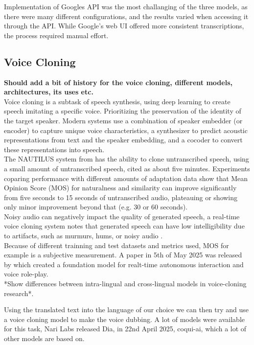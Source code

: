 \documentclass[12pt]{article}
\begin{document}
Implementation of Googles API was the most challanging of the three models, as there were many different configurations, and the results varied when accessing it through the API. While Google's web UI offered more consistent transcriptions, the process required manual effort. 

\subsection{Voice Cloning}
\textbf{Should add a bit of history for the voice cloning, different models, architectures, its uses etc.}\\Voice cloning is a subtask of speech synthesis, using deep learning to create speech imitating a specific voice. Prioritizing the preservation of the identity of the target speaker. Modern systems use a combination of speaker embedder (or encoder) to capture unique voice characteristics, a synthesizer to predict acoustic representations from text and the speaker embedding, and a cocoder to convert these representations into speech.\\
The NAUTILUS system from \cite{NAUTILUS} has the ability to clone untranscribed speech, using a small amount of untranscribed speech, cited as about five minutes. Experiments coparing performance with different amounts of adaptation data show that Mean Opinion Score (MOS) for naturalness and similarity can improve significantly from five seconds to 15 seconds of untranscribed audio, plateauing or showing only minor improvement beyond that (e.g. 30 or 60 seconds)\cite{Unified_system_for_Voice_Cloning_and_Voice_Conversion}.\\ 
Noisy audio can negatively impact the quality of generated speech, a real-time voice cloning system notes that generated speech can have low intelligibility due to artifacts, such as murmurs, hums, or noisy audio \cite{Real-time_voice_cloning_system}.\\
Because of different trainning and test datasets and metrics used, MOS for example is a subjective measurement.
A paper in 5th of May 2025 was released by \cite{viola-voice-role-play} which created a foundation model for realt-time autonomous interaction and voice role-play. \\
*Show differences between intra-lingual and cross-lingual models in voice-cloning research*. 

Using the translated text into the language of our choice we can then try and use a voice cloning model to make the voice dubbing. A lot of models were available for this task, Nari Labs released Dia, in 22nd April 2025, coqui-ai, which a lot of other models are based on. 
\end{document}
